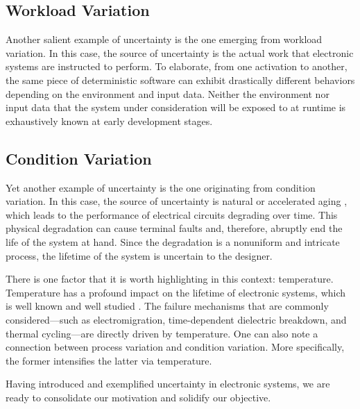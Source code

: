 \subsection{Workload Variation}

Another salient example of uncertainty is the one emerging from workload
variation. In this case, the source of uncertainty is the actual work that
electronic systems are instructed to perform. To elaborate, from one activation
to another, the same piece of deterministic software can exhibit drastically
different behaviors depending on the environment and input data. Neither the
environment nor input data that the system under consideration will be exposed
to at runtime is exhaustively known at early development stages.

\subsection{Condition Variation}

Yet another example of uncertainty is the one originating from condition
variation. In this case, the source of uncertainty is natural or accelerated
aging \cite{jedec2016}, which leads to the performance of electrical circuits
degrading over time. This physical degradation can cause terminal faults and,
therefore, abruptly end the life of the system at hand. Since the degradation is
a nonuniform and intricate process, the lifetime of the system is uncertain to
the designer.

There is one factor that it is worth highlighting in this context: temperature.
Temperature has a profound impact on the lifetime of electronic systems, which
is well known and well studied \cite{jedec2016}. The failure mechanisms that are
commonly considered---such as electromigration, time-dependent dielectric
breakdown, and thermal cycling---are directly driven by temperature. One can
also note a connection between process variation and condition variation. More
specifically, the former intensifies the latter via temperature.

\conclusioncut
Having introduced and exemplified uncertainty in electronic systems, we are
ready to consolidate our motivation and solidify our objective.
